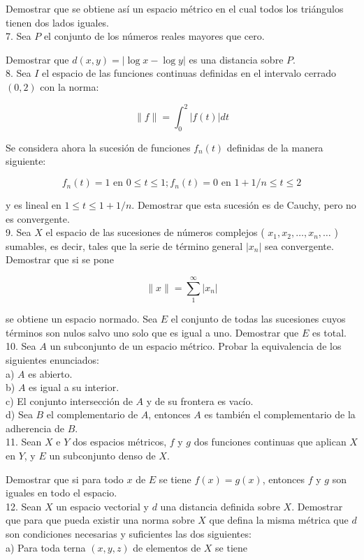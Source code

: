 \documentclass[10pt]{article}
\theoremstyle{plain}
\theoremstyle{definition}
\theoremstyle{remark}
\begin{document}
Demostrar que se obtiene así un espacio métrico en el cual todos los triángulos tienen dos lados iguales.\\
7. Sea $P$ el conjunto de los números reales mayores que cero.

Demostrar que $d(x, y)=|\log x-\log y|$ es una distancia sobre $P$.\\
8. Sea $I$ el espacio de las funciones continuas definidas en el intervalo cerrado $(0,2)$ con la norma:

$$
\|f\|=\int_{0}^{2}|f(t)| d t
$$

Se considera ahora la sucesión de funciones $f_{n}(t)$ definidas de la manera siguiente:


$$
f_{n}(t)=1 \text { en } 0 \leqslant t \leqslant 1 ; f_{n}(t)=0 \text { en } 1+1 / n \leqslant t \leqslant 2
$$

y es lineal en $1 \leqslant t \leqslant 1+1 / n$. Demostrar que esta sucesión es de Cauchy, pero no es convergente.\\
9. Sea $X$ el espacio de las sucesiones de números complejos ( $x_{1}, x_{2}, \ldots, x_{n}, \ldots$ ) sumables, es decir, tales que la serie de término general $\left|x_{n}\right|$ sea convergente. Demostrar que si se pone

$$
\|x\|=\sum_{1}^{\infty}\left|x_{n}\right|
$$

se obtiene un espacio normado. Sea $E$ el conjunto de todas las sucesiones cuyos términos son nulos salvo uno solo que es igual a uno. Demostrar que $E$ es total.\\
10. Sea $A$ un subconjunto de un espacio métrico. Probar la equivalencia de los siguientes enunciados:\\
a) $A$ es abierto.\\
b) $A$ es igual a su interior.\\
c) El conjunto intersección de $A$ y de su frontera es vacío.\\
d) Sea $B$ el complementario de $A$, entonces $A$ es también el complementario de la adherencia de $B$.\\
11. Sean $X$ e $Y$ dos espacios métricos, $f$ y $g$ dos funciones continuas que aplican $X$ en $Y$, y $E$ un subconjunto denso de $X$.

Demostrar que si para todo $x$ de $E$ se tiene $f(x)=g(x)$, entonces $f$ y $g$ son iguales en todo el espacio.\\
12. Sean $X$ un espacio vectorial y $d$ una distancia definida sobre $X$. Demostrar que para que pueda existir una norma sobre $X$ que defina la misma métrica que $d$ son condiciones necesarias y suficientes las dos siguientes:\\
a) Para toda terna $(x, y, z)$ de elementos de $X$ se tiene
\end{document}
